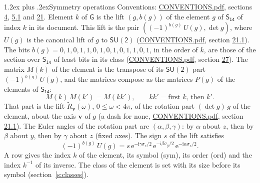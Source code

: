 \documentclass[10pt,a4paper]{article}
\makeatletter
\renewcommand\section{\@startsection{section}{1}{\z@}{-3ex plus -1ex minus -.2ex}%
  {1.2ex plus .2ex}{\normalfont\large\sffamily\bfseries\color{parttitle}}}
\numberwithin{equation}{section}
\newcommand{\grp}[1]{\mathsf{#1}}
\newcommand{\vv}{\mathbf{v}}
\newcommand{\iunit}{\mathrm{i}}
\newcommand{\expe}{\mathrm{e}}
\newcommand{\lift}[1]{\tilde{#1}}
\newcommand{\pauli}[1]{\sigma_{#1}}
\makeatother
\begin{document}
\section{Symmetry operations}\label{s:elements}
Conventions: \href{../../CONVENTIONS.pdf}{CONVENTIONS.pdf}, sections \href{../../../rotation/CONVENTIONS.pdf\#conv.4}{4}, \href{../../../rotation/CONVENTIONS.pdf\#conv.5.1}{5.1} and \href{../../CONVENTIONS.pdf\#conv.21}{21}.
\leavevmode\label{n:index.element}\label{n:element.g}\label{n:function.section}Element $k$ of $\grp{G}$ is the lift $(g, b(g))$ of the element $g$ of \href{../../../rotation/data/pdf/S14.pdf}{$\grp{S_{14}}$} of index $k$ in its document. This lift is the pair $((-1)^{b(g)}\,U(g), \det g)$, where $U(g)$ is the canonical lift of $g$ to $\grp{SU(2)}$ (\href{../../CONVENTIONS.pdf}{CONVENTIONS.pdf}, section \href{../../CONVENTIONS.pdf\#conv.21.1}{21.1}). The bits $b(g) = 0, 1, 0, 1, 1, 0, 1, 0, 1, 0, 1, 1, 0, 1$, in the order of $k$, are those of the section over $\grp{S_{14}}$ of least bits in its class (\href{../../CONVENTIONS.pdf}{CONVENTIONS.pdf}, section \href{../../CONVENTIONS.pdf\#conv.27}{27}). \label{n:matrix.element.pin}\label{n:matrix.element}The matrix $M(k)$ of the element is the transpose of its $\grp{SU(2)}$ part $(-1)^{b(g)}\,U(g)$, and the matrices compose as the matrices $P(g)$ of the elements of $\grp{S_{14}}$:
\begin{equation}\label{e:mprod}M(k)\,M(k') = M(kk'),\qquad kk' = \text{first } k\text{, then } k'.\end{equation}
\leavevmode\label{n:angle.omega}\label{n:vector.axis}\label{n:vector.pole}That part is the lift $\lift{R}_{\vv}(\omega)$, $0 \le \omega < 4\pi$, of the rotation part $(\det g)\,g$ of the element, about the axis $\vv$ of $g$ (a dash for none, \href{../../CONVENTIONS.pdf}{CONVENTIONS.pdf}, section \href{../../CONVENTIONS.pdf\#conv.21.1}{21.1}). \label{n:angle.euler.alpha}\label{n:angle.euler.beta}\label{n:angle.euler.gamma}\label{n:vector.coordinates}The Euler angles of the rotation part are $(\alpha,\beta,\gamma)$: by $\alpha$ about $z$, then by $\beta$ about $y$, then by $\gamma$ about $z$ (fixed axes). \label{n:local.euler.sign}The sign $s$ of the lift satisfies
\begin{equation}\label{e:euler}(-1)^{b(g)}\,U(g) = s\,\expe^{-\iunit\gamma\pauli{z}/2}\,\expe^{-\iunit\beta\pauli{y}/2}\,\expe^{-\iunit\alpha\pauli{z}/2}.\end{equation}
\leavevmode\label{n:index.element.inverse}\label{n:head.sym}\label{n:head.ord}A row gives the index $k$ of the element, its symbol (sym), its order (ord) and the index $k^{-1}$ of its inverse. \label{n:head.class}The class of the element is set with its size before its symbol (section~\ref{s:classes}).
\end{document}

